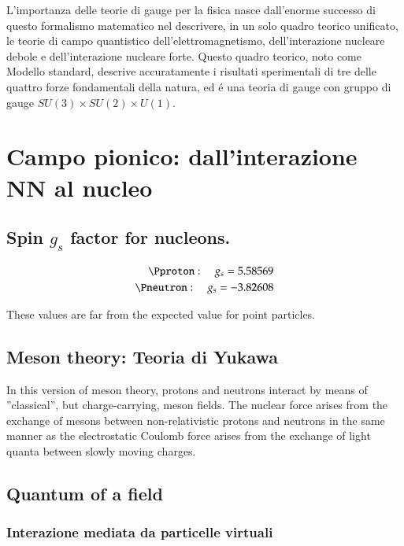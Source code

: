 \documentclass[main.tex]{subfiles}
\begin{document}
\begin{itemize*}
L'importanza delle teorie di gauge per la fisica nasce dall'enorme successo di questo formalismo matematico nel descrivere, in un solo quadro teorico unificato, le teorie di campo quantistico dell'elettromagnetismo, dell'interazione nucleare debole e dell'interazione nucleare forte. Questo quadro teorico, noto come Modello standard, descrive accuratamente i risultati sperimentali di tre delle quattro forze fondamentali della natura, ed \'e una teoria di gauge con gruppo di gauge $SU(3)\times SU(2)\times U(1)$.
\end{itemize*}

\chapter{Campo pionico: dall'interazione NN al nucleo}

\section{Spin $g_s$ factor for nucleons.}

\begin{align*}
\Pproton:\quad g_s=5.58569\\
\Pneutron:\quad g_s=-3.82608
\end{align*}

These values are far from the expected value for point particles.



\section{Meson theory: Teoria di Yukawa}

In this version of meson theory, protons and neutrons interact by means of ''classical'', but charge-carrying, meson fields. The nuclear force arises from the exchange of mesons between non-relativistic protons and neutrons in the same manner as the electrostatic Coulomb force arises from the exchange of light quanta between slowly moving charges.

\section{Quantum of a field}

\subsection{Interazione mediata da particelle virtuali}
\end{document}
